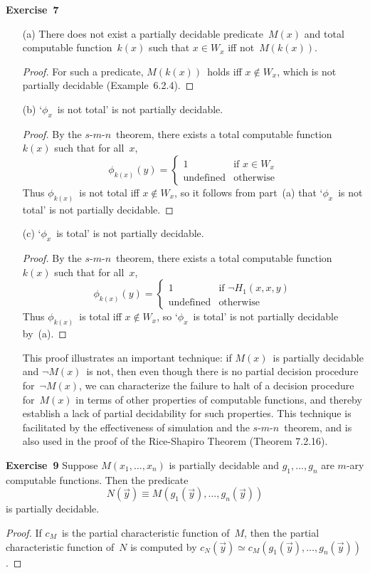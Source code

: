 \documentclass[letterpaper]{article}
\newcommand{\exercise}[2][]{\noindent\textbf{Exercise~{#2}}\ifthenelse{\isempty{#1}}{\textbf{.}}{ ({#1})\textbf{.}}}
\newcommand{\smn}{$s$-$m$-$n$}
\theoremstyle{plain}
\theoremstyle{definition}
\theoremstyle{remark}
\begin{document}
\goodbreak
\exercise{7}
\begin{enumerate}[itemsep=0pt]
\item[(a)] There does not exist a partially decidable predicate~$M(x)$ and total computable function~$k(x)$ such that $x\in W_x$ iff not~$M(k(x))$.
\begin{proof}
For such a predicate, $M(k(x))$~holds iff $x\not\in W_x$, which is not partially decidable (Example~6.2.4).
\end{proof}
\item[(b)] `$\phi_x$~is not total' is not partially decidable.
\begin{proof}
By the \smn\ theorem, there exists a total computable function~$k(x)$ such that for all~$x$,
$$\phi_{k(x)}(y)=\begin{cases}
1&\text{if }x\in W_x\\
\text{undefined}&\text{otherwise}
\end{cases}$$
Thus $\phi_{k(x)}$~is not total iff $x\not\in W_x$, so it follows from part~(a) that `$\phi_x$~is not total' is not partially decidable.
\end{proof}
\item[(c)] `$\phi_x$~is total' is not partially decidable.
\begin{proof}
By the \smn\ theorem, there exists a total computable function~$k(x)$ such that for all~$x$,
$$\phi_{k(x)}(y)=\begin{cases}
1&\text{if }\lnot H_1(x,x,y)\\
\text{undefined}&\text{otherwise}
\end{cases}$$
Thus $\phi_{k(x)}$~is total iff $x\not\in W_x$, so `$\phi_x$~is total' is not partially decidable by~(a).
\end{proof}
\noindent This proof illustrates an important technique: if $M(x)$~is partially decidable and $\lnot M(x)$~is not, then even though there is no partial decision procedure for~$\lnot M(x)$, we can characterize the failure to halt of a decision procedure for~$M(x)$ in terms of other properties of computable functions, and thereby establish a lack of partial decidability for such properties. This technique is facilitated by the effectiveness of simulation and the \smn\ theorem, and is also used in the proof of the Rice-Shapiro Theorem (Theorem 7.2.16).
\end{enumerate}

\exercise{9}
Suppose $M(x_1,\ldots,x_n)$ is partially decidable and $g_1,\ldots,g_n$ are $m$-ary computable functions. Then the predicate
$$N(\vec{y})\equiv M(g_1(\vec{y}),\ldots,g_n(\vec{y}))$$
is partially decidable.
\begin{proof}
If $c_M$~is the partial characteristic function of~$M$, then the partial characteristic function of~$N$ is computed by $c_N(\vec{y})\simeq c_M(g_1(\vec{y}),\ldots,g_n(\vec{y}))$.
\end{proof}
\end{document}
